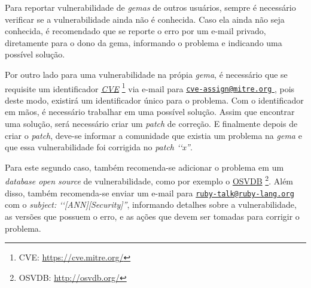 Para reportar vulnerabilidade de \emph{gemas} de outros usuários, sempre é necessário verificar
se a vulnerabilidade ainda não é conhecida. Caso ela ainda não seja conhecida, é recomendado que se
reporte o erro por um e-mail privado, diretamente para o dono da gema, informando o problema e
indicando uma possível solução.

Por outro lado para uma vulnerabilidade na própia \emph{gema}, é necessário que se requisite um
identificador \emph{\href{https://cve.mitre.org/}{CVE}}
\footnote{CVE: \url{https://cve.mitre.org/}} via e-mail para
\href{mailto:cve-assign@mitre.org}{\nolinkurl{cve-assign@mitre.org} }, pois deste modo, existirá
um identificador único para o problema. Com o identificador em mãos, é necessário trabalhar em uma
possível solução. Assim que encontrar uma solução, será necessário criar um \emph{patch} de correção.
E finalmente depois de criar o \emph{patch}, deve-se informar a comunidade que existia um problema na
\emph{gema} e que essa vulnerabilidade foi corrigida no \emph{patch ‘‘x''}.

Para este segundo caso, também recomenda-se adicionar o problema em um \emph{database open source}
de vulnerabilidade, como por exemplo o \href{http://osvdb.org/}{OSVDB}
\footnote{OSVDB: \url{http://osvdb.org/}}. Além disso, também recomenda-se enviar um e-mail para
\href{mailto:ruby-talk@ruby-lang.org} {\nolinkurl{ruby-talk@ruby-lang.org} } com o
\emph{subject: ‘‘[ANN][Security]''}, informando detalhes sobre a vulnerabilidade, as versões que
possuem o erro, e as ações que devem ser tomadas para corrigir o problema.
